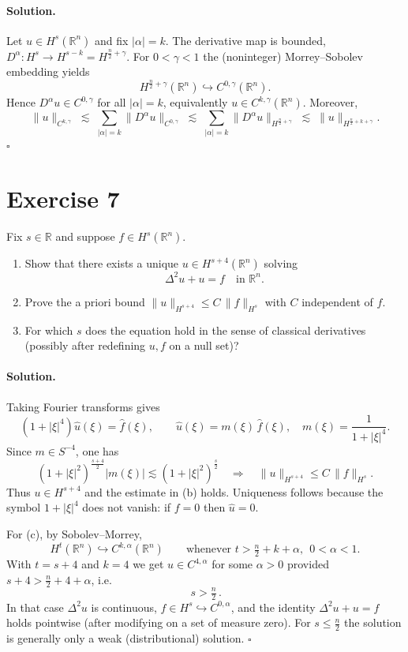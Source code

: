 \documentclass[12pt,a4paper]{article}
\newcommand{\qed}{\hfill$\square$}
\theoremstyle{plain}
\theoremstyle{definition}
\theoremstyle{remark}
\theoremstyle{remark}
\begin{document}
\paragraph{Solution.}
Let $u\in H^s(\mathbb R^n)$ and fix $|\alpha|=k$. The derivative map is bounded,
$D^\alpha:H^s\to H^{s-k}=H^{\frac n2+\gamma}$. For $0<\gamma<1$ the (noninteger) Morrey–Sobolev embedding yields
\[
H^{\frac n2+\gamma}(\mathbb R^n)\hookrightarrow C^{0,\gamma}(\mathbb R^n).
\]
Hence $D^\alpha u\in C^{0,\gamma}$ for all $|\alpha|=k$, equivalently $u\in C^{k,\gamma}(\mathbb R^n)$.
Moreover,
\[
\|u\|_{C^{k,\gamma}}\;\lesssim\;\sum_{|\alpha|=k}\|D^\alpha u\|_{C^{0,\gamma}}
\;\lesssim\;\sum_{|\alpha|=k}\|D^\alpha u\|_{H^{\frac n2+\gamma}}
\;\lesssim\;\|u\|_{H^{\frac n2+k+\gamma}}.
\]
\qed

\bigskip
\bigskip

\section*{Exercise 7}
Fix $s\in\mathbb R$ and suppose $f\in H^s(\mathbb R^n)$.
\begin{enumerate}\itemsep4pt
	\item[(a)] Show that there exists a unique $u\in H^{s+4}(\mathbb R^n)$ solving
	\[
	\Delta^2 u + u = f \quad\text{in }\mathbb R^n.
	\]
	\item[(b)] Prove the a priori bound $\|u\|_{H^{s+4}}\le C\,\|f\|_{H^s}$ with $C$ independent of $f$.
	\item[(c)] For which $s$ does the equation hold in the sense of classical derivatives (possibly after redefining $u,f$ on a null set)?
\end{enumerate}

\paragraph{Solution.}
Taking Fourier transforms gives
\[
(1+|\xi|^4)\widehat u(\xi)=\widehat f(\xi),\qquad
\widehat u(\xi)=m(\xi)\,\widehat f(\xi),\quad m(\xi)=\frac{1}{1+|\xi|^4}.
\]
Since $m\in S^{-4}$, one has
\[
(1+|\xi|^2)^{\frac{s+4}{2}}|m(\xi)| \lesssim (1+|\xi|^2)^{\frac{s}{2}}
\quad\Rightarrow\quad
\|u\|_{H^{s+4}}\le C\,\|f\|_{H^s}.
\]
Thus $u\in H^{s+4}$ and the estimate in (b) holds. Uniqueness follows because the symbol $1+|\xi|^4$ does not vanish:
if $f=0$ then $\widehat u=0$.

\medskip
For (c), by Sobolev–Morrey,
\[
H^{t}(\mathbb R^n)\hookrightarrow C^{k,\alpha}(\mathbb R^n)\qquad\text{whenever }t>\tfrac n2+k+\alpha,\ \ 0<\alpha<1.
\]
With $t=s+4$ and $k=4$ we get $u\in C^{4,\alpha}$ for some $\alpha>0$ provided $s+4>\frac n2+4+\alpha$, i.e.
\[
\boxed{\,s>\tfrac n2\,}.
\]
In that case $\Delta^2 u$ is continuous, $f\in H^s\hookrightarrow C^{0,\alpha}$, and the identity
$\Delta^2 u+u=f$ holds pointwise (after modifying on a set of measure zero).
For $s\le\tfrac n2$ the solution is generally only a weak (distributional) solution.
\qed
\end{document}

